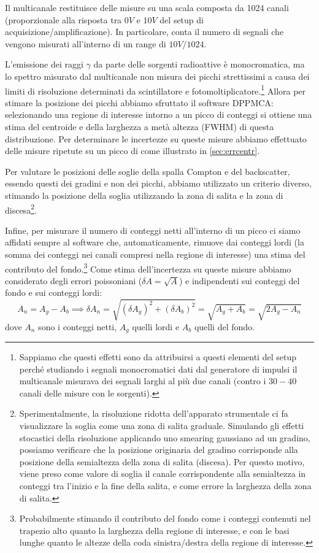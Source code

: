 Il multicanale restituisce delle misure su una scala composta da 1024 canali (proporzionale alla risposta tra $ 0\unit{V} $ e $ 10 \unit{V} $ del setup di acquisizione/amplificazione).
In particolare, conta il numero di segnali che vengono misurati all'interno di un range di $ 10\unit{V} / 1024 $.

L'emissione dei raggi $ \gamma $ da parte delle sorgenti radioattive è monocromatica, ma lo spettro misurato dal multicanale non misura dei picchi strettissimi a causa dei limiti di risoluzione determinati da scintillatore e fotomoltiplicatore.\footnote{Sappiamo che questi effetti sono da attribuirsi a questi elementi del setup perché studiando i segnali monocromatici dati dal generatore di impulsi il multicanale misurava dei segnali larghi al più due canali (contro i $ 30-40 $ canali delle misure con le sorgenti).}
Allora per stimare la posizione dei picchi abbiamo sfruttato il software DPPMCA: selezionando una regione di interesse intorno a un picco di conteggi si ottiene una stima del centroide e della larghezza a metà altezza (FWHM) di questa distribuzione.
Per determinare le incertezze su queste misure abbiamo effettuato delle misure ripetute su un picco di  come illustrato in \cref{sec:errcentr}.

Per valutare le posizioni delle soglie della spalla Compton e del backscatter, essendo questi dei gradini e non dei picchi, abbiamo utilizzato un criterio diverso, stimando la posizione della soglia utilizzando la zona di salita e la zona di discesa\footnote{Sperimentalmente, la risoluzione ridotta dell'apparato strumentale ci fa visualizzare la soglia come una zona di salita graduale. Simulando gli effetti stocastici della risoluzione applicando uno smearing gaussiano ad un gradino, possiamo verificare che la posizione originaria del gradino corrisponde alla posizione della semialtezza della zona di salita (discesa). Per questo motivo, viene preso come valore di soglia il canale corrispondente alla semialtezza in conteggi tra l'inizio e la fine della salita, e come errore la larghezza della zona di salita.}.

Infine, per misurare il numero di conteggi netti all'interno di un picco ci siamo affidati sempre al software che, automaticamente, rimuove dai conteggi lordi (la somma dei conteggi nei canali compresi nella regione di interesse) una stima del contributo del fondo.\footnote{Probabilmente stimando il contributo del fondo come i conteggi contenuti nel trapezio alto quanto la larghezza della regione di interesse, e con le basi lunghe quanto le altezze della coda sinistra/destra della regione di interesse.}
Come stima dell'incertezza su queste misure abbiamo considerato degli errori poissoniani ($\delta A = \sqrt{A}$) e indipendenti sui conteggi del fondo e sui conteggi lordi:
\begin{equation}
A_n = A_g - A_b \implies \delta A_n = \sqrt{(\delta A_g)^2 + (\delta A_b)^2} = \sqrt{A_g + A_b} = \sqrt{2A_g - A_n}
\end{equation}
dove $ A_n $ sono i conteggi netti, $ A_g $ quelli lordi e $ A_b $ quelli del fondo.
